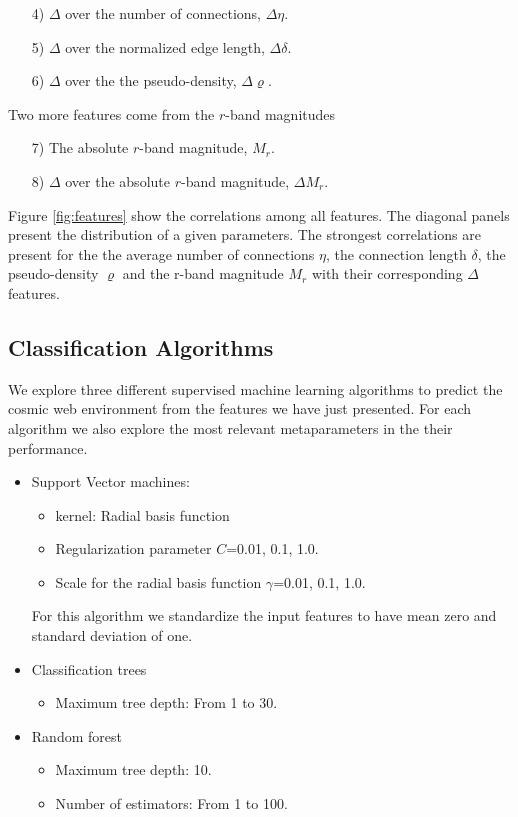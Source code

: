 \documentclass[usenatbib]{mnras}
\begin{document}
\begin{enumerate}
\item[4)] $\Delta$ over the number of connections, $\Delta\eta$.
\item[5)] $\Delta$ over the normalized edge length, $\Delta\delta$.
\item[6)] $\Delta$ over the the pseudo-density, $\Delta\varrho$.
\end{enumerate}

\noindent
Two more features come from the $r$-band magnitudes
\begin{enumerate}
\item[7)] The absolute $r$-band magnitude, $M_r$.
\item[8)] $\Delta$ over the absolute $r$-band magnitude, $\Delta M_r$.
\end{enumerate}

Figure \ref{fig:features} show the correlations among all features.
The diagonal panels present the distribution of a given parameters.
The strongest correlations are present for the the average number of
connections $\eta$, the connection length $\delta$, the
pseudo-density $\varrho$ and the r-band magnitude $M_r$ with their
corresponding $\Delta$ features.



\subsection{Classification Algorithms}

We explore three different supervised machine learning algorithms to predict the cosmic web environment from the features we have just
presented.
For each algorithm we also explore the most relevant metaparameters in
the their performance.

\begin{itemize}
    \item Support Vector machines: 
        \begin{itemize}
            \item kernel: Radial basis function
            \item Regularization parameter $C$=0.01, 0.1, 1.0.
            \item Scale for the radial basis function  $\gamma$=0.01, 0.1, 1.0.
        \end{itemize}
        For this algorithm we standardize the input features to have mean zero and standard deviation of one.
    \item Classification trees
      \begin{itemize}
      \item Maximum tree depth: From 1 to 30.
      \end{itemize}
    \item Random forest
        \begin{itemize}
            \item Maximum tree depth: 10.
            \item Number of estimators: From 1 to 100.
        \end{itemize}
\end{itemize}
\end{document}
